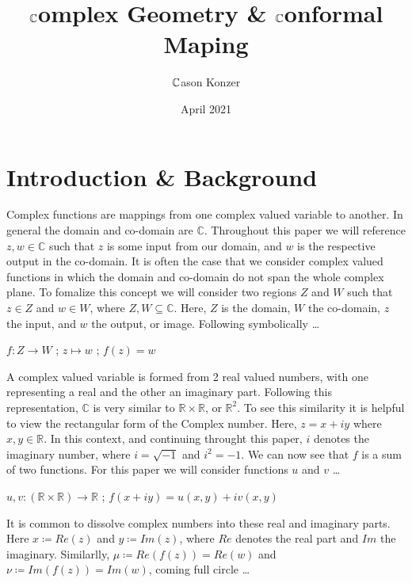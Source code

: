 \documentclass[a4paper,man,natbib]{apa6}
\title{$ \C $omplex Geometry \& $ \C $onformal Maping}
\author{ $\C $ason Konzer}
\date{April 2021}
\affiliation{University of Michigan}
\newcommand{\C}{\mathbb{C}}  %
\newcommand{\R}{\mathbb{R}}  %
\begin{document}
\maketitle

\section{Introduction \& Background}
\label{sec: Before we Start}

Complex functions are mappings from one complex valued variable to another. In general the domain and co-domain are $ \C $.
Throughout this paper we will reference $ z,w \in \C $ such that $ z $ is some input from our domain, and $ w $ is the respective output in the co-domain. 
It is often the case that we consider complex valued functions in which the domain and co-domain do not span the whole complex plane. 
To fomalize this concept we will consider two regions $ Z $ and $ W $ such that $ z \in Z $ and $ w \in W $, where $ Z,W \subseteq \C $. 
Here, $ Z $ is the domain, $ W $ the co-domain, $ z $ the input, and $ w $ the output, or image. Following symbolically \dots

\begin{center}

      $ f: Z \to W $ ; $ z \mapsto w $ ; $ f(z) = w $ 

\end{center}



A complex valued variable is formed from 2 real valued numbers, with one representing a real and the other an imaginary part.
Following this representation, $ \C $ is very similar to $ \R \times \R $, or $ \R^2 $.  
To see this similarity it is helpful to view the rectangular form of the Complex number. Here, $z = x + iy$ where $x,y \in \R$. 
In this context, and continuing throught this paper, $ i $ denotes the imaginary number, where $ i = \sqrt{-1} $ and $ i^2 = -1 $.
We can now see that $ f $ is a sum of two functions. For this paper we will consider functions $u$ and $v$ \dots

\begin{center}

      $ u,v: (\R \times \R) \to \R $ ; $ f(x+iy) = u(x,y) + iv(x,y) $ 

\end{center}

It is common to dissolve complex numbers into these real and imaginary parts. Here $ x \coloneqq Re(z) $ and $ y \coloneqq Im(z) $, where $ Re $ denotes the real part and $ Im $ the imaginary.
Similarlly, $ \mu \coloneqq Re(f(z)) = Re(w) $ and $ \nu \coloneqq Im(f(z)) = Im(w) $, coming full circle \dots
\end{document}

